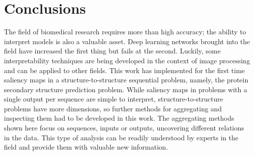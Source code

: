 \chapter{Conclusions} \label{Chapter: Conclusions}






The field of biomedical research requires more than high accuracy; the ability to interpret models is also a valuable asset. Deep learning networks brought into the field have increased the first thing but fails at the second. Luckily, some interpretability techniques are being developed in the context of image processing and can be applied to other fields. This work has implemented for the first time saliency maps in a structure-to-structure sequential problem, namely, the protein secondary structure prediction problem. While saliency maps in problems with a single output per sequence are simple to interpret, structure-to-structure problems have more dimensions, so further methods for aggregating and inspecting them had to be developed in this work. The aggregating methods shown here focus on sequences, inputs or outputs, uncovering different relations in the data. This type of analysis can be readily understood by experts in the field and provide them with valuable new information.

